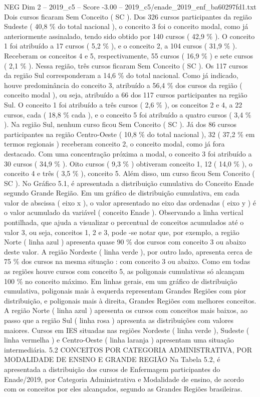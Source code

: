 \begin{textsample}{NEG Dim 2 – 2019\_c5 – Score -3.00 – 2019\_c5/enade\_2019\_enf\_ba60297fd1.txt}
Dois cursos ficaram Sem Conceito ( SC ).
Dos 326 cursos participantes da região Sudeste ( 40,8 \% do total nacional ), o conceito 3 foi o conceito modal, como já anteriormente assinalado, tendo sido obtido por 140 cursos ( 42,9 \% ).
O conceito 1 foi atribuído a 17 cursos ( 5,2 \% ), e o conceito 2, a 104 cursos ( 31,9 \% ).
Receberam os conceitos 4 e 5, respectivamente, 55 cursos ( 16,9 \% ) e sete cursos ( 2,1 \% ).
Nessa região, três cursos ficaram Sem Conceito ( SC ).
Os 117 cursos da região Sul corresponderam a 14,6 \% do total nacional.
Como já indicado, houve predominância do conceito 3, atribuído a 56,4 \% dos cursos da região ( conceito modal ), ou seja, atribuído a 66 dos 117 cursos participantes na região Sul.
O conceito 1 foi atribuído a três cursos ( 2,6 \% ), os conceitos 2 e 4, a 22 cursos, cada ( 18,8 \% cada ), e o conceito 5 foi atribuído a quatro cursos ( 3,4 \% ).
Na região Sul, nenhum curso ficou Sem Conceito ( SC ).
Já dos 86 cursos participantes na região Centro-Oeste ( 10,8 \% do total nacional ), 32 ( 37,2 \% em termos regionais ) receberam conceito 2, o conceito modal, como já fora destacado.
Com uma concentração próxima a modal, o conceito 3 foi atribuído a 30 cursos ( 34,9 \% ).
Oito cursos ( 9,3 \% ) obtiveram conceito 1, 12 ( 14,0 \% ), o conceito 4 e três ( 3,5 \% ), conceito 5.
Além disso, um curso ficou Sem Conceito ( SC ).
No Gráfico 5.1, é apresentada a distribuição cumulativa do Conceito Enade segundo Grande Região.
Em um gráfico de distribuição cumulativa, em cada valor de abscissa ( eixo x ), o valor apresentado no eixo das ordenadas ( eixo y ) é o valor acumulado da variável ( conceito Enade ).
Observando a linha vertical pontilhada, que ajuda a visualizar o percentual de conceitos acumulados até o valor 3, ou seja, conceitos 1, 2 e 3, pode -se notar que, por exemplo, a região Norte ( linha azul ) apresenta quase 90 \% dos cursos com conceito 3 ou abaixo deste valor.
A região Nordeste ( linha verde ), por outro lado, apresenta cerca de 75 \% dos cursos na mesma situação : com conceito 3 ou abaixo.
Como em todas as regiões houve cursos com conceito 5, as poligonais cumulativas só alcançam 100 \% no conceito máximo.
Em linhas gerais, em um gráfico de distribuição cumulativa, poligonais mais à esquerda representam Grandes Regiões com pior distribuição, e poligonais mais à direita, Grandes Regiões com melhores conceitos.
A região Norte ( linha azul ) apresenta os cursos com conceitos mais baixos, ao passo que a região Sul ( linha rosa ) apresenta as distribuições com valores maiores.
Cursos em IES situadas nas regiões Nordeste ( linha verde ), Sudeste ( linha vermelha ) e Centro-Oeste ( linha laranja ) apresentam uma situação intermediária. 5.2 CONCEITOS POR CATEGORIA ADMINISTRATIVA, POR MODALIDADE DE ENSINO E GRANDE REGIÃO Na Tabela 5.2, é apresentada a distribuição dos cursos de Enfermagem participantes do Enade/2019, por Categoria Administrativa e Modalidade de ensino, de acordo com os conceitos por eles alcançados, segundo as Grandes Regiões brasileiras.

\end{textsample}
